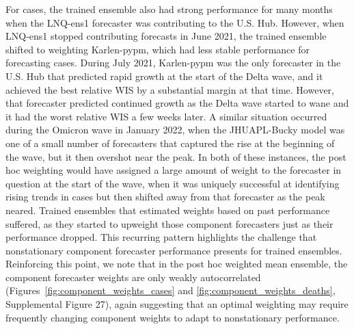 \documentclass[11pt,3p,authoryear]{elsarticle}
\begin{document}
For cases, the trained ensemble also had strong performance for many months when the LNQ-ens1 forecaster was contributing to the U.S. Hub.
However, when LNQ-ens1 stopped contributing forecasts in June 2021, the trained ensemble shifted to weighting Karlen-pypm, which had less stable performance for forecasting cases.
During July 2021, Karlen-pypm was the only forecaster in the U.S. Hub that predicted rapid growth at the start of the Delta wave, and it achieved the best relative WIS by a substantial margin at that time. However, that forecaster predicted continued growth as the Delta wave started to wane and it had the worst relative WIS a few weeks later.
A similar situation occurred during the Omicron wave in January 2022, when the JHUAPL-Bucky model was one of a small number of forecasters that captured the rise at the beginning of the wave, but it then overshot near the peak.
In both of these instances, the post hoc weighting would have assigned a large amount of weight to the forecaster in question at the start of the wave, when it was uniquely successful at identifying rising trends in cases \textemdash but then shifted away from that forecaster as the peak neared.
Trained ensembles that estimated weights based on past performance suffered, as they started to upweight those component forecasters just as their performance dropped.
This recurring pattern highlights the challenge that nonstationary component forecaster performance presents for trained ensembles.
Reinforcing this point, we note that in the post hoc weighted mean ensemble, the component forecaster weights are only weakly autocorrelated (Figures~\ref{fig:component_weights_cases} and \ref{fig:component_weights_deaths}, Supplemental Figure 27), again suggesting that an optimal weighting may require frequently changing component weights to adapt to nonstationary performance.

\end{document}
